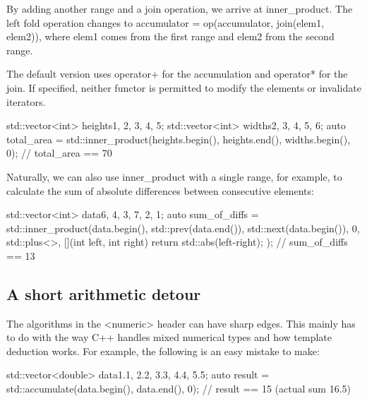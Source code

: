 By adding another range and a join operation, we arrive at inner\_product. The left fold operation changes to accumulator = op(accumulator, join(elem1, elem2)), where elem1 comes from the first range and elem2 from the second range.



The default version uses operator+ for the accumulation and operator* for the join. If specified, neither functor is permitted to modify the elements or invalidate iterators.

\begin{box-note}
\begin{cppcode}
std::vector<int> heights{1, 2, 3, 4, 5};
std::vector<int> widths{2, 3, 4, 5, 6};
auto total_area = std::inner_product(heights.begin(), heights.end(), widths.begin(), 0);
// total_area == 70
\end{cppcode}
\end{box-note}

Naturally, we can also use inner\_product with a single range, for example, to calculate the sum of absolute differences between consecutive elements:

\begin{box-note}
\begin{cppcode}
std::vector<int> data{6, 4, 3, 7, 2, 1};
auto sum_of_diffs = std::inner_product(data.begin(), std::prev(data.end()), 
                                       std::next(data.begin()), 
                                       0, std::plus<>{}, 
                                       [](int left, int right) { return std::abs(left-right); });
// sum_of_diffs == 13
\end{cppcode}
\end{box-note}

\subsection{A short arithmetic detour}

The algorithms in the <numeric> header can have sharp edges. This mainly has to do with the way C++ handles mixed numerical types and how template deduction works. For example, the following is an easy mistake to make:

\begin{box-note}
\begin{cppcode}
std::vector<double> data{1.1, 2.2, 3.3, 4.4, 5.5};
auto result = std::accumulate(data.begin(), data.end(), 0);
// result == 15 (actual sum 16.5)
\end{cppcode}
\end{box-note}

